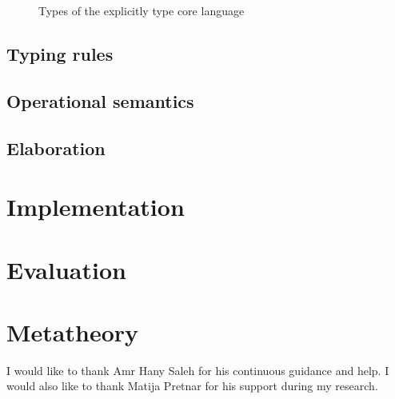 \documentclass[sigplan,10pt]{acmart}\settopmatter{printfolios=true}
\begin{document}
\begin{figure}
\begin{center}
\end{center}
\caption{Types of the explicitly type core language}\label{fig:types:explicit}
\end{figure}


\subsection{Typing rules}


\subsection{Operational semantics}


\subsection{Elaboration}


\section{Implementation}


\section{Evaluation}


\section{Metatheory}


\begin{acks}
  I would like to thank Amr Hany Saleh for his continuous guidance and help. I would also like to thank Matija Pretnar for his support during my research.
\end{acks}


\end{document}
